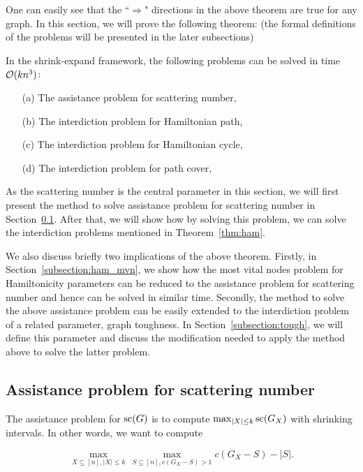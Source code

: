 One can easily see that the ``$\Rightarrow$" directions in the above theorem are true for any graph. In this section, we will prove the following theorem: (the formal definitions of the problems will be presented in the later subsections)

\begin{theorem}
\label{thm:ham}
In the shrink-expand framework, the following problems can be solved in time $\mathcal{O}(kn^3)$:
\begin{itemize}
	\item[(a)] The assistance problem for scattering number,
	\item[(b)] The interdiction problem for Hamiltonian path,
	\item[(c)] The interdiction problem for Hamiltonian cycle,
	\item[(d)] The interdiction problem for path cover,
\end{itemize}
\end{theorem}

As the scattering number is the central parameter in this section, we will first present the method to solve  assistance problem for scattering number in Section~\ref{subsection:scat}.
After that, we will show how by solving this problem, we can solve the interdiction problems mentioned in Theorem~\ref{thm:ham}.

We also discuss briefly two implications of the above theorem. 
Firstly, in Section~\ref{subsection:ham_mvn}, we show how the most vital nodes problem for Hamiltonicity parameters can be reduced to the assistance problem for scattering number and hence can be solved in similar time. 
Secondly, the method to solve the above assistance problem can be easily extended to the interdiction problem of a related parameter, graph toughness. 
In Section~\ref{subsection:tough}, we will define this parameter and discuss the modification needed to apply the method above to solve the latter problem. 

\subsection{Assistance problem for scattering number}
\label{subsection:scat}

The assistance problem for $\text{sc}(G)$ is to compute $\max_{|X| \leq k}\text{sc}(G_X)$ with shrinking intervals. 
In other words, we want to compute 

\begin{equation}
\label{eq:scat_assist}
  \max_{X \subseteq [n], |X| \leq k} \, \max_{S \subseteq [n], c(G_X - S) > 1} c(G_X - S) - |S|.
\end{equation}

